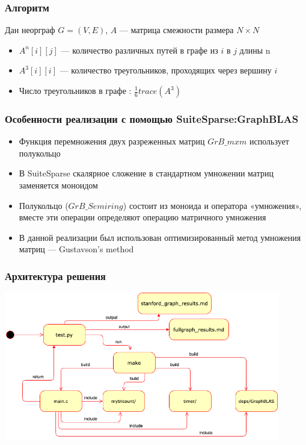 \documentclass{beamer}
\begin{document}
\begin{frame}
  \transwipe[direction=90]
  \frametitle{Алгоритм}
  Дан неорграф $G = (V, E)$, $A$ --- матрица смежности размера $N \times N$ \\ 
  \begin{itemize}
      \item $A^n[i][j]$ --- количество различных путей в графе из $i$ в $j$ длины n
      \item $A^3[i][i]$ --- количество треугольников, проходящих через вершину $i$
      \item Число треугольников в графе : $\frac{1}{6} trace(A^{3})$
  \end{itemize}
\end{frame}

\begin{frame}
  \transwipe[direction=90]
  \frametitle{Особенности реализации с помощью SuiteSparse:GraphBLAS}
  \begin{itemize}
      \item Функция перемножения двух разреженных матриц $GrB\_mxm$ использует полукольцо
      \item В SuiteSparse скалярное сложение в стандартном умножении матриц заменяется моноидом
      \item Полукольцо ($GrB\_Semiring$) состоит из моноида и оператора «умножения», вместе эти операции определяют операцию матричного умножения
      \item В данной реализации был использован оптимизированный метод умножения матриц --- Gustavson's method
  \end{itemize}
\end{frame}

\begin{frame}
  \transwipe[direction=90]
  \frametitle{Архитектура решения}
\includegraphics[width=12cm]{./pictures/arch1.png}
\end{frame}
\end{document}
